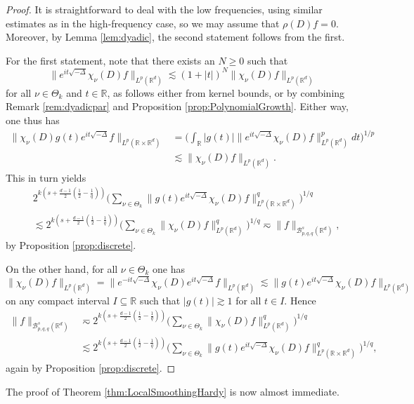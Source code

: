 \documentclass{amsart}
\theoremstyle{definition}
\newcommand{\R}{\mathbb{R}}
\newcommand {\Rd}{\mathbb{R}^{d}}
\newcommand {\Baspqq}{\mathcal{B}^{s}_{p,q,q}(\Rd)}
\numberwithin{equation}{section}
\begin{document}
\begin{proof}
It is straightforward to deal with the low frequencies, using similar estimates as in the high-frequency case, so we may assume that $\rho(D)f=0$. Moreover, by Lemma \ref{lem:dyadic}, the second statement follows from the first.


For the first statement, note that there exists an $N\geq0$ such that
\[
\|e^{it\sqrt{-\Delta}}\chi_{\nu}(D)f\|_{L^{p}(\Rd)}\lesssim (1+|t|)^{N}\|\chi_{\nu}(D)f\|_{L^{p}(\Rd)}
\]
for all $\nu\in\Theta_{k}$ and $t\in\R$, as follows either from kernel bounds, or by combining Remark \ref{rem:dyadicpar} and Proposition \ref{prop:PolynomialGrowth}. Either way, one thus has
\begin{align*}
\|\chi_{\nu}(D)g(t)e^{it\sqrt{-\Delta}}f\|_{L^{p}(\R\times\Rd)}&=\Big(\int_{\R}|g(t)|\|e^{it\sqrt{-\Delta}}\chi_{\nu}(D)f\|^{p}_{L^{p}(\Rd)}dt\Big)^{1/p}\\
&\lesssim \|\chi_{\nu}(D)f\|_{L^{p}(\Rd)}.
\end{align*}
This in turn yields
\begin{align*}
&2^{k(s+\frac{d-1}{2}(\frac{1}{2}-\frac{1}{q}))}\Big(\sum_{\nu\in\Theta_{k}}\|g(t)e^{it\sqrt{-\Delta}}\chi_{\nu}(D)f\|_{L^{p}(\R\times\Rd)}^{q}\Big)^{1/q}\\
&\lesssim 2^{k(s+\frac{d-1}{2}(\frac{1}{2}-\frac{1}{q}))}\Big(\sum_{\nu\in\Theta_{k}}\|\chi_{\nu}(D)f\|_{L^{p}(\Rd)}^{q}\Big)^{1/q}\eqsim \|f\|_{\Baspqq},
\end{align*}
by Proposition \ref{prop:discrete}.

On the other hand, for all $\nu\in\Theta_{k}$ one has
\[
\|\chi_{\nu}(D)f\|_{L^{p}(\Rd)}=\|e^{-it\sqrt{-\Delta}}\chi_{\nu}(D)e^{it\sqrt{-\Delta}}f\|_{L^{p}(\Rd)}\lesssim \|g(t)e^{it\sqrt{-\Delta}}\chi_{\nu}(D)f\|_{L^{p}(\Rd)}
\]
on any compact interval $I\subseteq\R$ such that $|g(t)|\gtrsim 1$ for all $t\in I$. Hence
\begin{align*}
\|f\|_{\Baspqq}&\eqsim 2^{k(s+\frac{d-1}{2}(\frac{1}{2}-\frac{1}{q}))}\Big(\sum_{\nu\in\Theta_{k}}\|\chi_{\nu}(D)f\|_{L^{p}(\Rd)}^{q}\Big)^{1/q}\\
&\lesssim 2^{k(s+\frac{d-1}{2}(\frac{1}{2}-\frac{1}{q}))}\Big(\sum_{\nu\in\Theta_{k}}\|g(t)e^{it\sqrt{-\Delta}}\chi_{\nu}(D)f\|_{L^{p}(\R\times\Rd)}^{q}\Big)^{1/q},
\end{align*}
again by Proposition \ref{prop:discrete}.
\end{proof}

The proof of Theorem \ref{thm:LocalSmoothingHardy} is now almost immediate.
\end{document}

